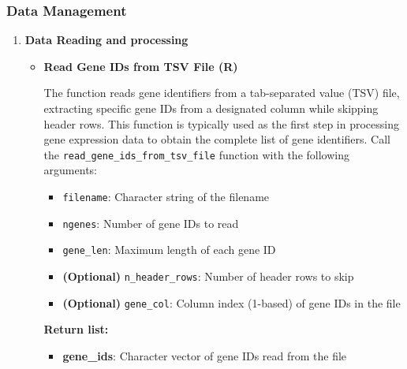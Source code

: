 \subsubsection{Data Management}
\begin{enumerate}
    \item \textbf{Data Reading and processing}
          
          \begin{itemize}
            \item \textbf{Read Gene IDs from TSV File (R)}
                  
                  The function reads gene identifiers from a tab-separated value (TSV) file,
                  extracting specific gene IDs from a designated column while skipping
                  header rows. This function is typically used as the first step in processing
                  gene expression data to obtain the complete list of gene identifiers. Call
                  the \texttt{read\_gene\_ids\_from\_tsv\_file} function with the following arguments:
                  
                  \begin{itemize}
                    \item \texttt{filename}: Character string of the filename
                          
                    \item \texttt{ngenes}: Number of gene IDs to read
                          
                    \item \texttt{gene\_len}: Maximum length of each gene ID
                          
                    \item \textbf{(Optional)} \texttt{n\_header\_rows}: Number of header
                          rows to skip
                          
                    \item \textbf{(Optional)} \texttt{gene\_col}: Column index (1-based) of
                          gene IDs in the file
                  \end{itemize}
                  
                  \textbf{Return list:}
                  \begin{itemize}
                    \item \textbf{gene\_ids}: Character vector of gene IDs read from the file
                          

\end{itemize}
\end{itemize}
\end{enumerate}
